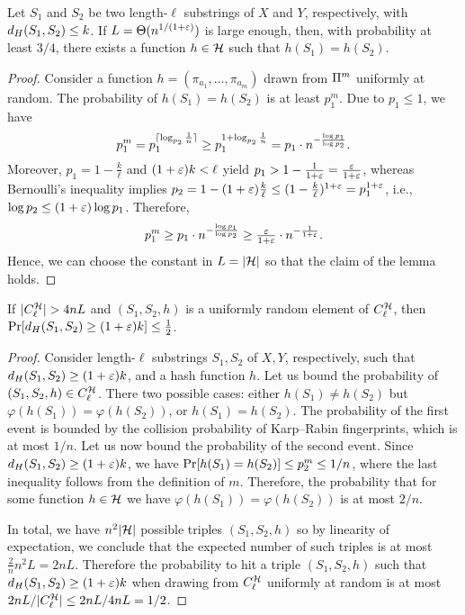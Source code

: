 \begin{lemma}\label{lm:hash_function_exists}
Let $S_1$ and $S_2$ be two length-$\ell$ substrings of $X$ and $Y$, respectively, with $d_H(S_1, S_2) \le k$. 
If $L=\Theta(n^{1/(1+\varepsilon)})$ is large enough, then, with probability at least $3/4$, there exists a function $h\in \mathcal{H}$ such that $h(S_1)=h(S_2)$.
\end{lemma}
\begin{proof}
Consider a function $h=(\pi_{a_1},\ldots,\pi_{a_m})$ drawn from $\Pi^m$ uniformly at random. The probability of $h(S_1)=h(S_2)$ is at least $p_1^m$.
Due to $p_1 \le 1$, we have \[p_1^m = p_1^{\lceil\log_{p_2}\frac1n\rceil} \ge p_1^{1+\log_{p_2}\frac1n}=p_1\cdot n^{-\frac{\log p_1}{\log p_2}}.\]
Moreover, $p_1 = 1-\frac{k}{\ell}$ and $(1+\varepsilon)k < \ell$ yield $p_1 > 1-\frac{1}{1+\varepsilon}=\frac{\varepsilon}{1+\varepsilon}$,
whereas Bernoulli's inequality implies $p_2 = 1-(1+\varepsilon)\frac{k}{\ell} \le (1-\frac{k}{\ell})^{1+\varepsilon}=p_1^{1+\varepsilon}$,
i.e., $\log p_2  \le (1+\varepsilon)\log p_1$.
Therefore, \[p_1^m \ge p_1\cdot n^{-\frac{\log p_1}{\log p_2}}\ge\tfrac{\varepsilon}{1+\varepsilon}\cdot n^{-\frac{1}{1+\varepsilon}}.\]
Hence, we can choose the constant in $L=|\mathcal{H}|$ so that the claim of the lemma holds.
\end{proof}

\begin{lemma}\label{lm:bad_collisions}
If $|C^{\mathcal{H}}_{\ell}| > 4 nL$ and $(S_1,S_2, h)$ is a uniformly random element of $C^{\mathcal{H}}_{\ell}$, then $\mathrm{Pr}[d_H(S_1,S_2) \ge (1+\varepsilon) k] \le \frac12$.
\end{lemma}
\begin{proof}
Consider length-$\ell$ substrings $S_1, S_2$ of $X, Y$, respectively, such that $d_H(S_1, S_2) \ge (1+\varepsilon)k$, and a hash function $h$. Let us bound the probability of $(S_1,S_2, h) \in C^{\mathcal{H}}_{\ell}$. There two possible cases: either $h(S_1) \neq h(S_2)$ but $\varphi(h(S_1)) = \varphi(h(S_2))$, or $h(S_1) = h(S_2)$. The probability of the first event is bounded by the collision probability of Karp--Rabin fingerprints, which is at most $1/n$. Let us now bound the probability of the second event. Since $d_H (S_1,S_2)\ge (1+\varepsilon)k$, we have $\mathrm{Pr} [h (S_1) = h (S_2)] \le p_2^{m} \le 1/n$,  
where the last inequality follows from the definition of $m$. Therefore, the probability that for some function $h \in \mathcal{H}$ we have $\varphi(h(S_1)) = \varphi(h(S_2))$ is at most $2/n$. 

In total, we have $n^2 |\mathcal{H}|$ possible triples $(S_1, S_2 ,h)$ so by linearity of expectation, we conclude that the expected number of such triples is at most $\frac{2}{n} n^2 L =2n L$. Therefore the probability to hit a triple $(S_1, S_2, h)$ such that $d_H(S_1, S_2) \ge (1+\varepsilon)k$ when drawing from $C^{\mathcal{H}}_{\ell}$ uniformly at random is at most $2nL / |C^{\mathcal{H}}_{\ell}| \le 2nL / 4nL = 1/2$.
\end{proof}

